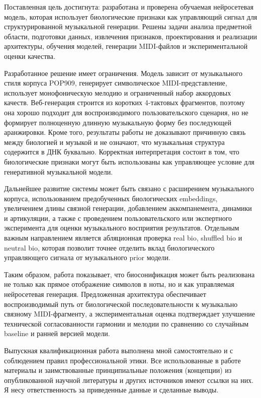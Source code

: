 Поставленная цель достигнута: разработана и проверена обучаемая нейросетевая модель, которая использует биологические признаки как управляющий сигнал для структурированной музыкальной генерации. Решены задачи анализа предметной области, подготовки данных, извлечения признаков, проектирования и реализации архитектуры, обучения моделей, генерации MIDI-файлов и экспериментальной оценки качества.

Разработанное решение имеет ограничения. Модель зависит от музыкального стиля корпуса POP909, генерирует символическое MIDI-представление, использует монофоническую мелодию и ограниченный набор аккордовых качеств. Веб-генерация строится из коротких 4-тактовых фрагментов, поэтому она хорошо подходит для воспроизводимого пользовательского сценария, но не формирует полноценную длинную музыкальную форму без последующей аранжировки. Кроме того, результаты работы не доказывают причинную связь между биологией и музыкой и не означают, что музыкальная структура содержится в ДНК буквально. Корректная интерпретация состоит в том, что биологические признаки могут быть использованы как управляющее условие для генеративной музыкальной модели.

Дальнейшее развитие системы может быть связано с расширением музыкального корпуса, использованием предобученных биологических embeddings, увеличением длины связной генерации, добавлением аккомпанемента, динамики и артикуляции, а также с проведением пользовательского или экспертного эксперимента для оценки музыкального восприятия результатов. Отдельным важным направлением является абляционная проверка real bio, shuffled bio и neutral bio, которая позволит точнее отделить вклад биологического управляющего сигнала от музыкального prior модели.

Таким образом, работа показывает, что биосонификация может быть реализована не только как прямое отображение символов в ноты, но и как управляемая нейросетевая генерация. Предложенная архитектура обеспечивает воспроизводимый путь от биологической последовательности к музыкально связному MIDI-фрагменту, а экспериментальная оценка подтверждает улучшение технической согласованности гармонии и мелодии по сравнению со случайным baseline и ранней версией модели.

\vspace{8mm}

Выпускная квалификационная работа выполнена мной самостоятельно и с соблюдением правил профессиональной этики. Все использованные в работе материалы и заимствованные принципиальные положения (концепции) из опубликованной научной литературы и других источников имеют ссылки на них. Я несу ответственность за приведенные данные и сделанные выводы.

